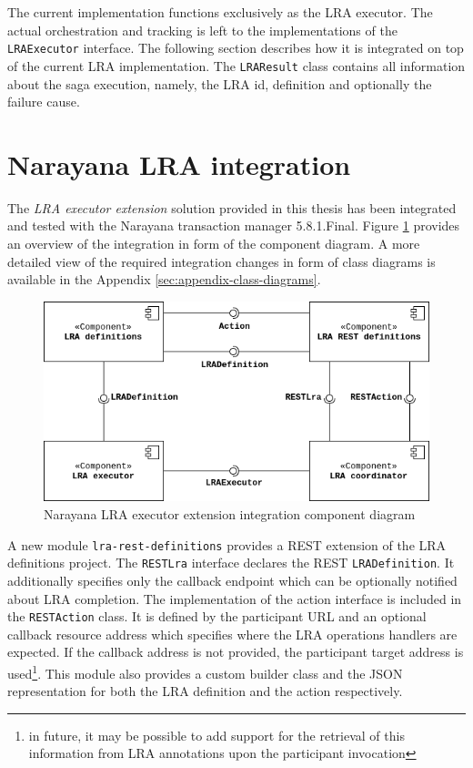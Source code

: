 \documentclass[oneside,
  digital, %
  table,   %
  lof,     %
  lot,     %
]{fithesis3}
\begin{document}
The current implementation functions exclusively as the LRA executor. The actual orchestration and tracking is left to the implementations of the \texttt{LRAExecutor} interface. The following section describes how it is integrated on top of the current LRA implementation. The \texttt{LRAResult} class contains all information about the saga execution, namely, the LRA id, definition and optionally the failure cause.

\section{Narayana LRA integration}
\label{sec:narayana-lra-integration}

The \textit{LRA executor extension} solution provided in this thesis has been integrated and tested with the Narayana transaction manager 5.8.1.Final. Figure \ref{fig:integration-component} provides an overview of the integration in form of the component diagram. A more detailed view of the required integration changes in form of class diagrams is available in the Appendix \ref{sec:appendix-class-diagrams}.

\begin{figure}[h]
    \begin{center}
        \includegraphics[width=1.0\textwidth]{images/componentDiagrams/narayana-integration-component.png}
    \end{center}
    \caption{Narayana LRA executor extension integration component diagram}
    \label{fig:integration-component}
\end{figure}

A new module \texttt{lra-rest-definitions} provides a REST extension of the LRA definitions project. The \texttt{RESTLra} interface declares the REST \texttt{LRADefinition}. It additionally specifies only the callback endpoint which can be optionally notified about LRA completion. The implementation of the action interface is included in the \texttt{RESTAction} class. It is defined by the participant URL and an optional callback resource address which specifies where the LRA operations handlers are expected. If the callback address is not provided, the participant target address is used\footnote{in future, it may be possible to add support for the retrieval of this information from LRA annotations upon the participant invocation}. This module also provides a custom builder class and the JSON representation for both the LRA definition and the action respectively.
\end{document}
